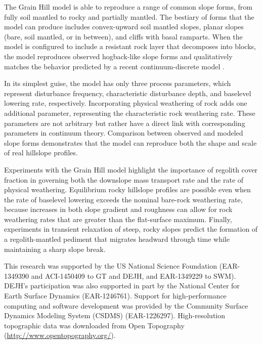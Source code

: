 \documentclass[esurf, manuscript]{copernicus}
\begin{document}
The Grain Hill model is able to reproduce a range of common slope forms, from fully soil mantled to rocky and partially mantled. The bestiary of forms that the model can produce includes convex-upward soil mantled slopes, planar slopes (bare, soil mantled, or in between), and cliffs with basal ramparts. When the model is configured to include a resistant rock layer that decomposes into blocks, the model reproduces observed hogback-like slope forms and qualitatively matches the behavior predicted by a recent continuum-discrete model \citep{glade2017block,glade2017quasi}.

In its simplest guise, the model has only three process parameters, which represent disturbance frequency, characteristic disturbance depth, and baselevel lowering rate, respectively. Incorporating physical weathering of rock adds one additional parameter, representing the characteristic rock weathering rate. These parameters are not arbitrary but rather have a direct link with corresponding parameters in continuum theory. Comparison between observed and modeled slope forms demonstrates that the model can reproduce both the shape and scale of real hillslope profiles.

Experiments with the Grain Hill model highlight the importance of regolith cover fraction in governing both the downslope mass transport rate and the rate of physical weathering. Equilibrium rocky hillslope profiles are possible even when the rate of baselevel lowering exceeds the nominal bare-rock weathering rate, because increases in both slope gradient and roughness can allow for rock weathering rates that are greater than the flat-surface maximum. Finally, experiments in transient relaxation of steep, rocky slopes predict the formation of a regolith-mantled pediment that migrates headward through time while maintaining a sharp slope break.





\begin{acknowledgements}
This research was supported by the US National Science Foundation (EAR-1349390 and ACI-1450409 to GT and DEJH, and EAR-1349229 to SWM). DEJH's participation was also supported in part by the National Center for Earth Surface Dynamics (EAR-1246761). Support for high-performance computing and software development was provided by the Community Surface Dynamics Modeling System (CSDMS) (EAR-1226297). High-resolution topographic data was downloaded from Open Topography (\url{http://www.opentopography.org/}).
\end{acknowledgements}
\end{document}
